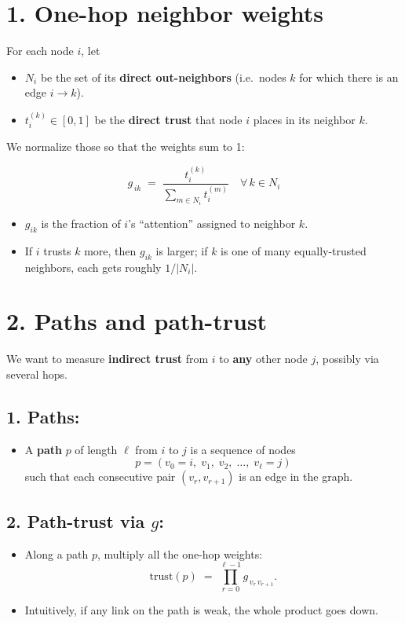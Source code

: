 \documentclass{article}
\begin{document}
\section*{1. One-hop neighbor weights}

For each node \(i\), let  
\begin{itemize}
    \item \(N_i\) be the set of its \textbf{direct out-neighbors} (i.e.\ nodes \(k\) for which there is an edge \(i\to k\)).  
    \item \(t_i^{(k)}\in[0,1]\) be the \textbf{direct trust} that node \(i\) places in its neighbor \(k\).
\end{itemize}

We normalize those so that the weights sum to 1:

\[
  \boxed{
    g_{\,i k}
    \;=\;
    \frac{t_i^{(k)}}{\displaystyle\sum_{m\in N_i}t_i^{(m)}}
    \quad
    \forall\,k\in N_i
  }
\]

\begin{itemize}
    \item \textbf{\(g_{ik}\)} is the fraction of \(i\)'s ``attention'' assigned to neighbor \(k\).  
    \item If \(i\) trusts \(k\) more, then \(g_{ik}\) is larger; if \(k\) is one of many equally-trusted neighbors, each gets roughly \(1/|N_i|\).
\end{itemize}

\section*{2. Paths and path-trust}

We want to measure \textbf{indirect trust} from \(i\) to \textbf{any} other node \(j\), possibly via several hops.  

\subsection*{1. Paths:}
\begin{itemize}
    \item A \textbf{path} \(p\) of length \(\ell\) from \(i\) to \(j\) is a sequence of nodes  
    \[
      p = (v_0=i,\;v_1,\;v_2,\;\dots,\;v_\ell=j)
    \]  
    such that each consecutive pair \((v_{r},v_{r+1})\) is an edge in the graph.
\end{itemize}

\subsection*{2. Path-trust via \(g\):}
\begin{itemize}
    \item Along a path \(p\), multiply all the one-hop weights:  
    \[
      \mathrm{trust}(p)
      \;=\;
      \prod_{r=0}^{\ell-1}
        g_{\,v_r\,v_{r+1}}.
    \]
    \item Intuitively, if any link on the path is weak, the whole product goes down.
\end{itemize}
\end{document}

